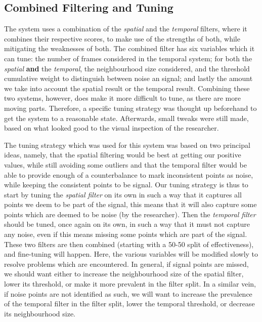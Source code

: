 \subsection{Combined Filtering and Tuning}
\label{sub-section: methodology - data filtering - combined filtering and tuning}

The system uses a combination of the \textit{spatial} and the \textit{temporal} filters, where it combines their respective scores, to make use of the strengths of both, while mitigating the weaknesses of both.
The combined filter has six variables which it can tune: the number of frames considered in the temporal system; for both the \textit{spatial} \textbf{and} the \textit{temporal}, the neighbourhood size considered, and the threshold cumulative weight to distinguish between noise an signal; and lastly the amount we take into account the spatial result or the temporal result.
Combining these two systems, however, does make it more difficult to tune, as there are more moving parts.
Therefore, a specific tuning strategy was thought up beforehand to get the system to a reasonable state. Afterwards, small tweaks were still made, based on what looked good to the visual inspection of the researcher.

The tuning strategy which was used for this system was based on two principal ideas, namely, that the spatial filtering would be best at getting our positive values, while still avoiding some outliers and that the temporal filter would be able to provide enough of a counterbalance to mark inconsistent points as noise, while keeping the consistent points to be signal.
Our tuning strategy is thus to start by tuning the \textit{spatial filter} on its own in such a way that it captures all points we deem to be part of the signal, this means that it will also capture some points which are deemed to be noise (by the researcher).
Then the \textit{temporal filter} should be tuned, once again on its own, in such a way that it must not capture any noise, even if this means missing some points which are part of the signal.
These two filters are then combined (starting with a 50-50 split of effectiveness), and fine-tuning will happen. 
Here, the various variables will be modified slowly to resolve problems which are encountered.
In general, if signal points are missed, we should want either to increase the neighbourhood size of the spatial filter, lower its threshold, or make it more prevalent in the filter split.
In a similar vein, if noise points are not identified as such, we will want to increase the prevalence of the temporal filter in the filter split, lower the temporal threshold, or decrease its neighbourhood size.

